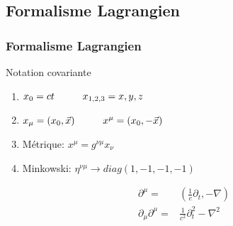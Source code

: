 \documentclass[handout]{beamer}
\begin{document}
\subsection{Formalisme Lagrangien}
\begin{frame}

\frametitle{Formalisme Lagrangien}

\begin{block}{Notation covariante}

\begin{enumerate}
\item $x_0 = ct \hspace{1 cm} x_{1,2,3} = x,y,z$
\item $x_\mu = (x_0,\vec{x}) \hspace{1 cm} x^\mu = (x_0,-\vec{x})$
\item Métrique: $x^\mu = g^{\nu\mu} x_\nu$
\item Minkowski: $\eta^{\nu\mu} \rightarrow diag(1,-1,-1,-1)$
\end{enumerate}

\end{block}
\begin{align*}
\partial^\mu =& (\frac{1}{c} \partial_t, -\nabla) \\
\partial_\mu \partial^\mu =& \frac{1}{c^2} \partial_t^2- \nabla^2
\end{align*}
\end{frame}
\end{document}
